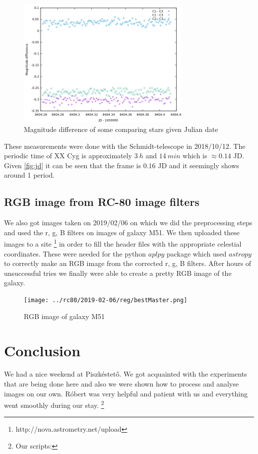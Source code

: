 \documentclass[a4paper,12pt]{article}
\begin{document}
\begin{figure}[H]
    \centering
    \includegraphics[width=0.75\textwidth]{../PSCH-20181012/psch/20181012/mag-jd-comp.png}
    \caption{Magnitude difference of some comparing stars given Julian date}
\end{figure}

\par These measurements were done with the Schmidt-telescope in 2018/10/12. The periodic time of
XX Cyg is approximately $3~h$ and $14~min$ which is $\approx 0.14$ JD. Given \ref{fig:jd} it can be seen that the frame
is $0.16$ JD and it seemingly shows around 1 period.

\subsection{RGB image from RC-80 image filters}

\par We also got images taken on 2019/02/06 on which we did the preprocessing steps and used the
r, g, B filters on images of galaxy M51. We then uploaded these images to a site \footnote{http://nova.astrometry.net/upload}
in order to fill the header files with the appropriate celestial coordinates. These were needed for the
python $aplpy$ package which used $astropy$ to correctly make an RGB image from the corrected r, g, B 
filters. After hours of unsuccessful tries we finally were able to create a pretty RGB image 
of the galaxy.

\vspace{0.6cm}

\begin{figure}[H]
    \centering
    \texttt{[image: ../rc80/2019-02-06/reg/bestMaster.png]}
    \caption{RGB image of galaxy M51}
\end{figure}

\newpage

\section{Conclusion}

\par We had a nice weekend at Piszkéstető. We got acquainted with the
experiments that are being done here and also we were shown how to process
and analyse images on our own. Róbert was very helpful and patient with us
and everything went smoothly during our stay. \footnote{Our scripts: }
\end{document}
